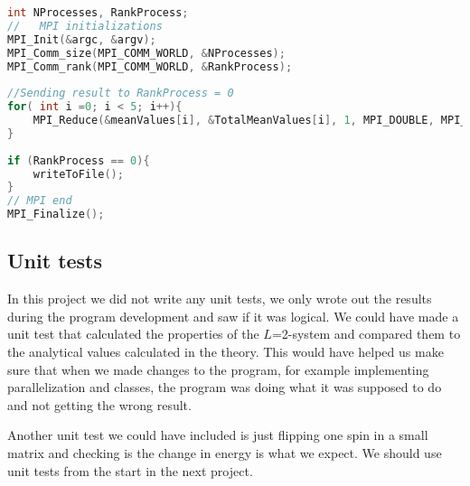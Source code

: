 \begin{lstlisting}[language=C++]
int NProcesses, RankProcess;
//   MPI initializations
MPI_Init(&argc, &argv);
MPI_Comm_size(MPI_COMM_WORLD, &NProcesses);
MPI_Comm_rank(MPI_COMM_WORLD, &RankProcess);
 
//Sending result to RankProcess = 0
for( int i =0; i < 5; i++){
    MPI_Reduce(&meanValues[i], &TotalMeanValues[i], 1, MPI_DOUBLE, MPI_SUM, 0, MPI_COMM_WORLD);
}
    
if (RankProcess == 0){
    writeToFile();
}
// MPI end     
MPI_Finalize();
\end{lstlisting}


\subsection{Unit tests}

In this project we did not write any unit tests, we only wrote out the results during the program development and saw if it was logical. We could have made a unit test that calculated the properties of the $L$=2-system and compared them to the analytical values calculated in the theory. This would have helped us make sure that when we made changes to the program, for example implementing parallelization and classes, the program was doing what it was supposed to do and not getting the wrong result. 

Another unit test we could have included is just flipping one spin in a small matrix and checking is the change in energy is what we expect. We should use unit tests from the start in the next project.
	
